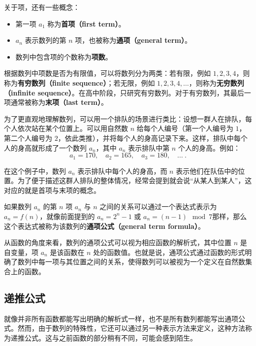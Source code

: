 关于项，还有一些概念：
\begin{itemize}
\item 第一项 $a_1$ 称为\textbf{首项（first term）}。 
\item $a_n$ 表示数列的第 $n$ 项，也被称为\textbf{通项（general term）}。
\item 数列中包含项的个数称为\textbf{项数}。
\end{itemize}

根据数列中项数是否为有限值，可以将数列分为两类：若有限，例如 $1, 2, 3, 4$，则称为\textbf{有穷数列（finite sequence）}；若无限，例如 $1, 2, 3, 4, \dots$，则称为\textbf{无穷数列（infinite sequence）}。在高中阶段，只研究有穷数列。对于有穷数列，其最后一项通常被称为\textbf{末项（last term）}。

为了更直观地理解数列，可以用一个排队的场景进行类比：设想一群人在排队，每个人依次站在某个位置上。可以用自然数 $n$ 给每个人编号（第一个人编号为 $1$，第二个人编号为 $2$，依此类推），并将每个人的身高记录下来。这样，排队中每个人的身高就形成了一个数列 ${a_n}$，其中 $a_n$ 表示排队中第 $n$ 个人的身高。例如：
\begin{equation}
a_1 = 170, \quad a_2 = 165, \quad a_3 = 180, \quad \dots~.
\end{equation}

在这个例子中，数列 ${a_n}$ 表示排队中每个人的身高，而 $n$ 表示他们在队伍中的位置。为了便于描述这群人排队的整体情况，经常会提到就会说“从某人到某人”，这对应的就是首项与末项的概念。

如果数列 ${a_n}$ 的第 $n$ 项 $a_n$ 与 $n$ 之间的关系可以通过一个表达式表示为 $a_n = f(n)$，就像前面提到的 $a_n = 2^n - 1$ 或 $a_n = (n-1) \mod 7$那样，那么这个表达式被称为该数列的\textbf{通项公式（general term formula）}。

从函数的角度来看，数列的通项公式可以视为相应函数的解析式，其中位置 $n$ 是自变量，项 $a_n$ 是该函数在 $n$ 处的函数值。也就是说，通项公式通过函数的形式明确了数列中每一项与其位置之间的关系，使得数列可以被视为一个定义在自然数集合上的函数。

\subsection{递推公式}

就像并非所有函数都能写出明确的解析式一样，也不是所有数列都能写出通项公式。然而，由于数列的特殊性，它还可以通过另一种表示方法来定义，这种方法称为递推公式。这与之前函数的部分稍有不同，可能会感到陌生。

